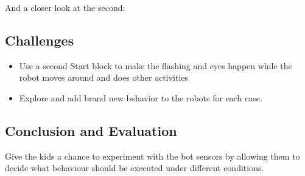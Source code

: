 \documentclass{lessonplan}
\begin{document}
        And a closer look at the second:


    \subsection{Challenges}
      \begin{itemize}
        \item Use a second Start block to make the flashing and eyes happen while the robot moves around and does other activities
        \item Explore and add brand new behavior to the robots for each case.
      \end{itemize}
    \subsection{Conclusion and Evaluation}
      Give the kids a chance to experiment with the bot sensors by allowing them to decide what behaviour should be executed under different conditions.
\end{document}
